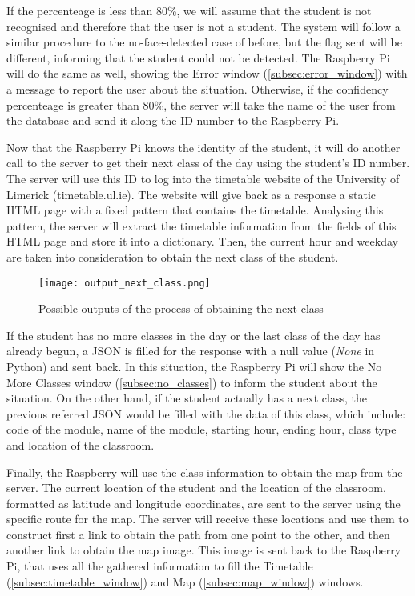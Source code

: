 	If the percenteage is less than 80\%, we will assume that the student is not recognised and therefore that the user is not a student. The system will follow a similar procedure to the no-face-detected case of before, but the flag sent will be different, informing that the student could not be detected. The Raspberry Pi will do the same as well, showing the Error window (\ref{subsec:error_window}) with a message to report the user about the situation. Otherwise, if the confidency percenteage is greater than 80\%, the server will take the name of the user from the database and send it along the ID number to the Raspberry Pi.

	Now that the Raspberry Pi knows the identity of the student, it will do another call to the server to get their next class of the day using the student's ID number. The server will use this ID to log into the timetable website of the University of Limerick (timetable.ul.ie). The website will give back as a response a static HTML page with a fixed pattern that contains the timetable. Analysing this pattern, the server will extract the timetable information from the fields of this HTML page and store it into a dictionary. Then, the current hour and weekday are taken into consideration to obtain the next class of the student.   

	\begin{figure}[!ht]
		\centering
		\texttt{[image: output\_next\_class.png]}
		\caption{Possible outputs of the process of obtaining the next class}
		\label{fig:output_next_class}
	\end{figure}

	If the student has no more classes in the day or the last class of the day has already begun, a JSON is filled for the response with a null value (\textit{None} in Python) and sent back. In this situation, the Raspberry Pi will show the No More Classes window (\ref{subsec:no_classes}) to inform the student about the situation. On the other hand, if the student actually has a next class, the previous referred JSON would be filled with the data of this class, which include: code of the module, name of the module, starting hour, ending hour, class type and location of the classroom.

	Finally, the Raspberry will use the class information to obtain the map from the server. The current location of the student and the location of the classroom, formatted as latitude and longitude coordinates, are sent to the server using the specific route for the map. The server will receive these locations and use them to construct first a link to obtain the path from one point to the other, and then another link to obtain the map image. This image is sent back to the Raspberry Pi, that uses all the gathered information to fill the Timetable (\ref{subsec:timetable_window}) and Map (\ref{subsec:map_window}) windows.

